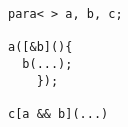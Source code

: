 
\begin{lstlisting}[mathescape]
para< > a, b, c;

a([&b](){
  b(...);
    });

c[a && b](...)
\end{lstlisting}

